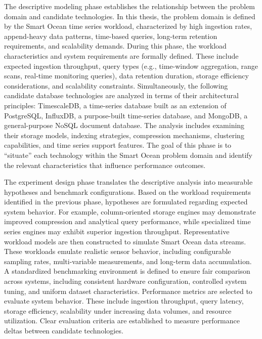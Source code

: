 The descriptive modeling phase establishes the relationship between the problem domain and candidate technologies. In this thesis, the problem domain is defined by the Smart Ocean time series workload, characterized by high ingestion rates, append-heavy data patterns, time-based queries, long-term retention requirements, and scalability demands. During this phase, the workload characteristics and system requirements are formally defined. These include expected ingestion throughput, query types (e.g., time-window aggregation, range scans, real-time monitoring queries), data retention duration, storage efficiency considerations, and scalability constraints. Simultaneously, the following candidate database technologies are analyzed in terms of their architectural principles: TimescaleDB, a time-series database built as an extension of PostgreSQL, InfluxDB, a purpose-built time-series database, and MongoDB, a general-purpose NoSQL document database. The analysis includes examining their storage models, indexing strategies, compression mechanisms, clustering capabilities, and time series support features. The goal of this phase is to “situate” each technology within the Smart Ocean problem domain and identify the relevant characteristics that influence performance outcomes.

The experiment design phase translates the descriptive analysis into measurable hypotheses and benchmark configurations. Based on the workload requirements identified in the previous phase, hypotheses are formulated regarding expected system behavior. For example, column-oriented storage engines may demonstrate improved compression and analytical query performance, while specialized time series engines may exhibit superior ingestion throughput. Representative workload models are then constructed to simulate Smart Ocean data streams. These workloads emulate realistic sensor behavior, including configurable sampling rates, multi-variable measurements, and long-term data accumulation. A standardized benchmarking environment is defined to ensure fair comparison across systems, including consistent hardware configuration, controlled system tuning, and uniform dataset characteristics. Performance metrics are selected to evaluate system behavior. These include ingestion throughput, query latency, storage efficiency, scalability under increasing data volumes, and resource utilization. Clear evaluation criteria are established to measure performance deltas between candidate technologies.

